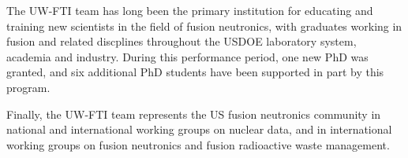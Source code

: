 The \gls{UW-FTI} team has long been the primary institution for educating and
training new scientists in the field of fusion neutronics, with graduates
working in fusion and related discplines throughout the \gls{USDOE} laboratory
system, academia and industry.  During this performance period, one new PhD
was granted, and six additional PhD students have been supported in part by
this program.

Finally, the \gls{UW-FTI} team represents the US fusion neutronics community
in national and international working groups on nuclear data, and in
international working groups on fusion neutronics and fusion radioactive waste
management.

